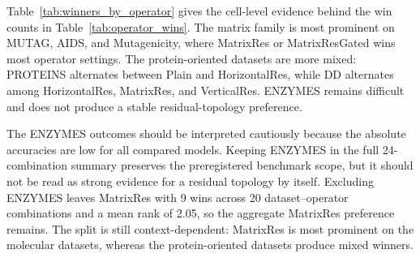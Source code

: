 Table~\ref{tab:winners_by_operator} gives the cell-level evidence behind the win counts in Table~\ref{tab:operator_wins}. The matrix family is most prominent on MUTAG, AIDS, and Mutagenicity, where MatrixRes or MatrixResGated wins most operator settings. The protein-oriented datasets are more mixed: PROTEINS alternates between Plain and HorizontalRes, while DD alternates among HorizontalRes, MatrixRes, and VerticalRes. ENZYMES remains difficult and does not produce a stable residual-topology preference.

\begin{table}[!htbp]
\centering
\scriptsize
\caption{Winning model for each dataset and message-passing operator. Values in parentheses are mean best test accuracy.}
\label{tab:winners_by_operator}
\end{table}

The ENZYMES outcomes should be interpreted cautiously because the absolute accuracies are low for all compared models. Keeping ENZYMES in the full 24-combination summary preserves the preregistered benchmark scope, but it should not be read as strong evidence for a residual topology by itself. Excluding ENZYMES leaves MatrixRes with 9 wins across 20 dataset--operator combinations and a mean rank of 2.05, so the aggregate MatrixRes preference remains. The split is still context-dependent: MatrixRes is most prominent on the molecular datasets, whereas the protein-oriented datasets produce mixed winners.


